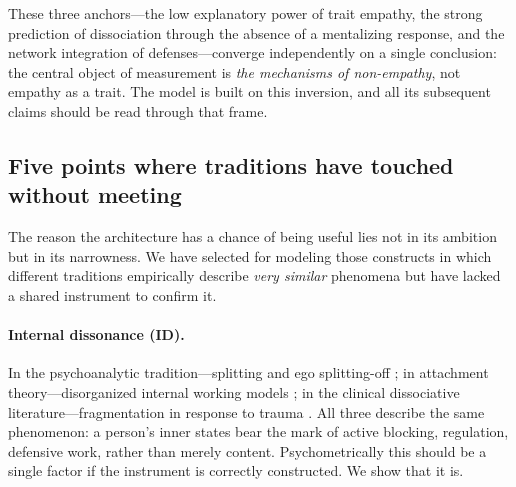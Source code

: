 These three anchors---the low explanatory power of trait empathy, the strong prediction of dissociation through the absence of a mentalizing response, and the network integration of defenses---converge independently on a single conclusion: the central object of measurement is \emph{the mechanisms of non-empathy}, not empathy as a trait. The \DEIC{} model is built on this inversion, and all its subsequent claims should be read through that frame.

\subsection{Five points where traditions have touched without meeting}

The reason the \DEIC{} architecture has a chance of being useful lies not in its ambition but in its narrowness. We have selected for modeling those constructs in which different traditions empirically describe \emph{very similar} phenomena but have lacked a shared instrument to confirm it.

\paragraph{Internal dissonance (ID).}
In the psychoanalytic tradition---splitting and ego splitting-off \citep{ferenczi1933, klein1946}; in attachment theory---disorganized internal working models \citep{main1986}; in the clinical dissociative literature---fragmentation in response to trauma \citep{putnam1997, vanderkolk2014}. All three describe the same phenomenon: a person's inner states bear the mark of active blocking, regulation, defensive work, rather than merely content. Psychometrically this should be a single factor if the instrument is correctly constructed. We show that it is.

